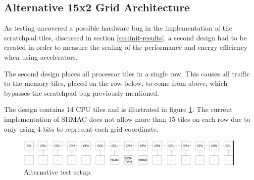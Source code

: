 \subsection{Alternative 15x2 Grid Architecture}
As testing uncovered a possible hardware bug in the implementation of the scratchpad tiles,
discussed in section \ref{sec:init-results}, a second design had to be created
in order to measure the scaling of the performance and energy efficiency when using accelerators.

The second design places all processor tiles in a single row. This causes all traffic
to the memory tiles, placed on the row below, to come from above, which bypasses the
scratchpad bug previously mentioned.

The design contains 14 CPU tiles and is illustrated in figure \ref{fig:15x2}. The
current implementation of SHMAC does not allow more than 15 tiles on each row due
to only using 4 bits to represent each grid coordinate.

\begin{figure}[htb]
    \centering
    \includegraphics[width=1.0\textwidth]{Figures/Measurements/15x2}
    \caption{Alternative test setup.}
    \label{fig:15x2}
\end{figure}

